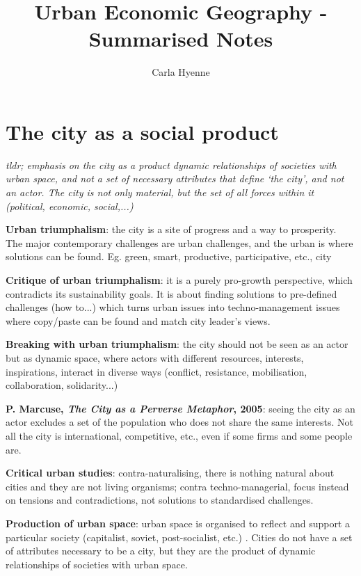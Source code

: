 \documentclass{article}
\title{Urban Economic Geography - Summarised Notes}
\author{Carla Hyenne }
\newcommand{\alignedmarginpar}[1]{%
        \marginpar{\raggedright\small #1}
    }
\begin{document}
\maketitle

\tableofcontents

\pagebreak

\section{The city as a social product}

\textit{tldr; emphasis on the city as a product dynamic relationships of societies with urban space, and not a set of necessary attributes that define `the city', and not an actor. The city is not only material, but the set of all forces within it (political, economic, social,...)}

\textbf{Urban triumphalism}: the city is a site of progress and a way to prosperity. The major contemporary challenges are urban challenges, and the urban is where solutions can be found. Eg. green, smart, productive, participative, etc., city \alignedmarginpar{Glaeser}

\textbf{Critique of urban triumphalism}: it is a purely pro-growth perspective, which contradicts its sustainability goals. It is about finding solutions to pre-defined challenges (how to...) which turns urban issues into techno-management issues where copy/paste can be found and match city leader's views.

\textbf{Breaking with urban triumphalism}:  the city should not be seen as an actor but as dynamic space, where actors with different resources, interests, inspirations, interact in diverse ways (conflict, resistance, mobilisation, collaboration, solidarity...)\alignedmarginpar{Marcuse}

\textbf{P. Marcuse, \textit{The City as a Perverse Metaphor}, 2005}: seeing the city as an actor excludes a set of the population who does not share the same interests. Not all the city is international, competitive, etc., even if some firms and some people are.

\textbf{Critical urban studies}: contra-naturalising, there is nothing natural about cities and they are not living organisms; contra techno-managerial, focus instead on tensions and contradictions, not solutions to standardised challenges.\alignedmarginpar{Lefebvre}

\textbf{Production of urban space}: urban space is organised to reflect and support a particular society (capitalist, soviet, post-socialist, etc.)\alignedmarginpar{LA vs. Moscow}. Cities do not have a set of attributes necessary to be a city, but they are the product of dynamic relationships of societies with urban space.
\end{document}

